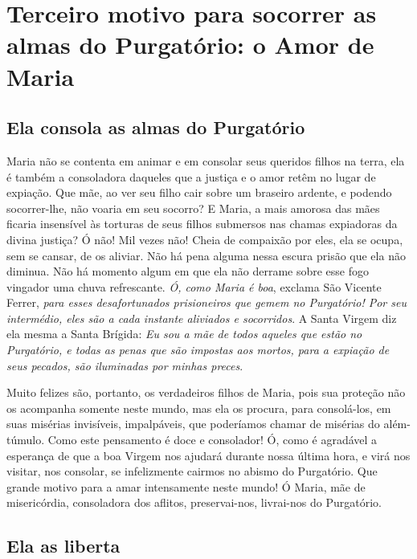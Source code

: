 \renewcommand{\thechapterdisplay}{Décimo oitavo dia}
\renewcommand{\thechapterrunner}{Terceiro motivo: o Amor de Maria}
\chapter[Décimo oitavo dia --- Terceiro motivo para socorrer as almas do Purgatório: o Amor de Maria]{Terceiro motivo para socorrer as almas do Purgatório: o Amor de Maria}
\section*{Ela consola as almas do Purgatório}


Maria não se contenta em animar e em consolar seus queridos filhos na terra, ela é também a consoladora daqueles que a justiça e o amor retêm no lugar de expiação. Que mãe, ao ver seu filho cair sobre um braseiro ardente, e podendo socorrer-lhe, não voaria em seu socorro? E Maria, a mais amorosa das mães ficaria insensível às torturas de seus filhos submersos nas chamas expiadoras da divina justiça? Ó não! Mil vezes não! Cheia de compaixão por eles, ela se ocupa, sem se cansar, de os aliviar. Não há pena alguma nessa escura prisão que ela não diminua. Não há momento algum em que ela não derrame sobre esse fogo vingador uma chuva refrescante. \textit{Ó, como Maria é boa}, exclama São Vicente Ferrer, \textit{para esses desafortunados prisioneiros que gemem no Purgatório! Por seu intermédio, eles são a cada instante aliviados e socorridos}. A Santa Virgem diz ela mesma a Santa Brígida: \textit{Eu sou a mãe de todos aqueles que estão no Purgatório, e todas as penas que são impostas aos mortos, para a expiação de seus pecados, são iluminadas por minhas preces}.

Muito felizes são, portanto, os verdadeiros filhos de Maria, pois sua proteção não os acompanha somente neste mundo, mas ela os procura, para consolá-los, em suas misérias invisíveis, impalpáveis, que poderíamos chamar de misérias do além-túmulo.
Como este pensamento é doce e consolador! Ó, como é agradável a esperança de que a boa Virgem nos ajudará durante nossa última hora, e virá nos visitar, nos consolar, se infelizmente cairmos no abismo do Purgatório. Que grande motivo para a amar intensamente neste mundo! Ó Maria, mãe de misericórdia, consoladora dos aflitos, preservai-nos, livrai-nos do Purgatório.


\section*{Ela as liberta}

